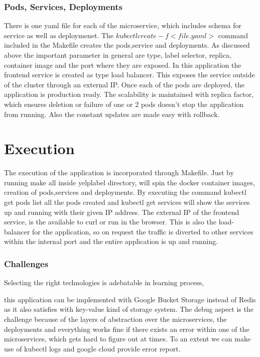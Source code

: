 \subsubsection{Pods, Services, Deployments} 

There is one yaml file for each of the microservice, which includes
schema for service as well as deploymenet. The
$kubectl create -f <file.yaml>$ command included in the Makefile
creates the pods,service and deployments. As discussed above the
important parameter in general are type, label selector, replica,
container image and the port where they are exposed.  In this
application the frontend service is created as type load
balancer. This exposes the service outside of the cluster through an
external IP. Once each of the pods are deployed, the application is
production ready. The scalability is maintained with replica factor,
which ensures deletion or failure of one or 2 pods doesn’t stop the
application from running. Also the constant updates are made easy with
rollback.
  
\section{Execution}

The execution of the application is incorporated through
Makefile. Just by running make all inside yelplabel directory, will
spin the docker container images, creation of pods,services and
deployments. By executing the command kubectl get pods list all the
pods created and kubectl get services will show the services up and
running with their given IP address. The external IP of the frontend
service, is the available to curl or run in the browser. This is also
the load-balancer for the application, so on request the traffic is
diverted to other services within the internal port and the entire
application is up and running.
  
\subsubsection{Challenges} 

Selecting the right technologies is adebatable in learning process,


this application can be implemented with Google Bucket Storage instead
of Redis as it also satisfies with key-value kind of storage
system. The debug aspect is the challenge because of the layers of
abstraction over the microservices, the deployments and everything
works fine if there exists an error within one of the microservices,
which gets hard to figure out at times. To an extent we can make use
of kubectl logs and google cloud provide error report.

